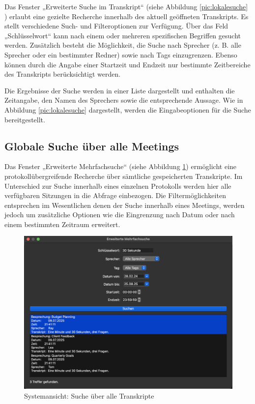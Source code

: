 Das Fenster „Erweiterte Suche im Transkript“ (siehe Abbildung \ref{pic:lokalesuche} ) erlaubt eine gezielte Recherche innerhalb des aktuell geöffneten Transkripts. Es stellt verschiedene Such- und Filteroptionen zur Verfügung. Über das Feld „Schlüsselwort“ kann nach einem oder mehreren spezifischen Begriffen gesucht werden. Zusätzlich besteht die Möglichkeit, die Suche nach Sprecher (z. B. alle Sprecher oder ein bestimmter Redner) sowie nach Tags einzugrenzen. Ebenso können durch die Angabe einer Startzeit und Endzeit nur bestimmte Zeitbereiche des Transkripts berücksichtigt werden.

Die Ergebnisse der Suche werden in einer Liste dargestellt und enthalten die Zeitangabe, den Namen des Sprechers sowie die entsprechende Aussage. Wie in Abbildung \ref{pic:lokalesuche} dargestellt, werden die Eingabeoptionen für die Suche bereitgestellt.

\subsection{Globale Suche über alle Meetings}

Das Fenster „Erweiterte Mehrfachsuche“ (siehe Abbildung \ref{pic:globalesuche}) ermöglicht eine protokollübergreifende Recherche über sämtliche gespeicherten Transkripte. Im Unterschied zur Suche innerhalb eines einzelnen Protokolls werden hier alle verfügbaren Sitzungen in die Abfrage einbezogen. Die Filtermöglichkeiten entsprechen im Wesentlichen denen der Suche innerhalb eines Meetings, werden jedoch um zusätzliche Optionen wie die Eingrenzung nach Datum oder nach einem bestimmten Zeitraum erweitert.

\clearpage   %
\begin{figure}[t]
\centering
\includegraphics[width=0.7\linewidth]{Bilder/globaleSuche.png}
\caption[Protokolsuche]{Systemansicht: Suche über alle Transkripte}
\label{pic:globalesuche}
\end{figure}

